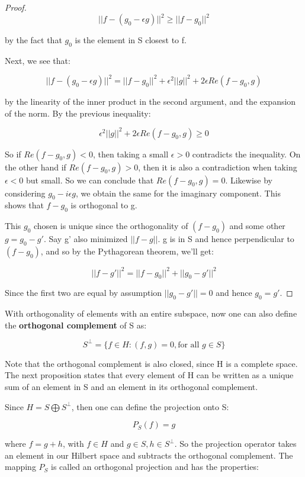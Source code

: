 \documentclass[class=article, crop=false]{standalone}
\begin{document}
\begin{proof}
				$$||f - (g_0 - \epsilon g)||^2 \ge ||f - g_0||^2$$

			by the fact that $g_0$ is the element in S closest to f.

			Next, we see that:

				$$||f - (g_0 - \epsilon g)||^2 = ||f - g_0||^2 + \epsilon^2||g||^2 + 2\epsilon Re(f - g_0, g)$$

			by the linearity of the inner product in the second argument, and the expansion of the norm. By the previous inequality:

				$$\epsilon^2||g||^2 + 2\epsilon Re(f - g_0, g) \ge 0$$

			So if $Re(f - g_0, g) < 0$, then taking a small $\epsilon > 0$ contradicts the inequality. On the other hand if $Re(f - g_0, g) > 0$, then it is also a contradiction when taking $\epsilon < 0$ but small. So we can conclude that $Re(f - g_0, g) = 0$. Likewise by considering $g_0 - i\epsilon g$, we obtain the same for the imaginary component. This shows that $f - g_0$ is orthogonal to g.			

			This $g_0$ chosen is unique since the orthogonality of $(f - g_0)$ and some other $g = g_0 - g'$. Say g' also minimized $||f - g||$. g is in S and hence perpendicular to $(f - g_0)$, and so by the Pythagorean theorem, we'll get:

				$$||f - g'||^2 = ||f - g_0||^2 + ||g_0 - g'||^2$$

			Since the first two are equal by assumption $||g_0 - g'|| = 0$ and hence $g_0 = g'$.
		\end{proof}

		With orthogonality of elements with an entire subspace, now one can also define the \textbf{orthogonal complement} of S as:

			$$S^\perp = \{f \in H: (f, g) = 0, \text{for all } g \in S\}$$

		Note that the orthogonal complement is also closed, since H is a complete space. The next proposition states that every element of H can be written as a unique sum of an element in S and an element in its orthogonal complement.

		Since $H = S \bigoplus S^\perp$, then one can define the projection onto S:

			$$P_S(f) = g$$

		where $f = g + h$, with $f \in H$ and $g \in S, h \in S^\perp$. So the projection operator takes an element in our Hilbert space and subtracts the orthogonal complement. The mapping $P_S$ is called an orthogonal projection and has the properties:
\end{document}
